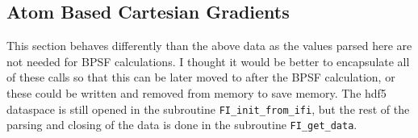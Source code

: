 \documentclass{article}
\begin{document}
\subsection{Atom Based Cartesian Gradients}
This section behaves differently than the above data as the values parsed here are not needed for BPSF calculations.
I thought it would be better to encapsulate all of these calls so that this can be later moved to after the BPSF calculation, or these could be written and removed from memory to save memory.
The hdf5 dataspace is still opened in the subroutine \texttt{FI\_init\_from\_ifi}, but the rest of the parsing and closing of the data is done in the subroutine \texttt{FI\_get\_data}.
\end{document}
